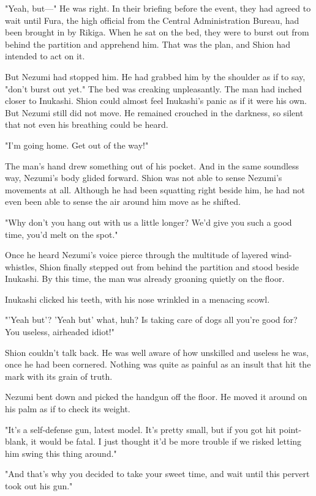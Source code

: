 "Yeah, but---" He was right. In their briefing before the event, they had
agreed to wait until Fura, the high official from the Central
Administration Bureau, had been brought in by Rikiga. When he sat on the
bed, they were to burst out from behind the partition and apprehend him.
That was the plan, and Shion had intended to act on it.

But Nezumi had stopped him. He had grabbed him by the shoulder as if to
say, "don't burst out yet." The bed was creaking unpleasantly. The man
had inched closer to Inukashi. Shion could almost feel Inukashi's panic
as if it were his own. But Nezumi still did not move. He remained
crouched in the darkness, so silent that not even his breathing could be
heard.

"I'm going home. Get out of the way!"

The man's hand drew something out of his pocket. And in the same
soundless way, Nezumi's body glided forward. Shion was not able to sense
Nezumi's movements at all. Although he had been squatting right beside
him, he had not even been able to sense the air around him move as he
shifted.

"Why don't you hang out with us a little longer? We'd give you such a
good time, you'd melt on the spot."

Once he heard Nezumi's voice pierce through the multitude of layered
wind-whistles, Shion finally stepped out from behind the partition and
stood beside Inukashi. By this time, the man was already groaning
quietly on the floor.

Inukashi clicked his teeth, with his nose wrinkled in a menacing scowl.

"'Yeah but'? 'Yeah but' what, huh? Is taking care of dogs all you're
good for? You useless, airheaded idiot!"

Shion couldn't talk back. He was well aware of how unskilled and useless
he was, once he had been cornered. Nothing was quite as painful as an
insult that hit the mark with its grain of truth.

Nezumi bent down and picked the handgun off the floor. He moved it
around on his palm as if to check its weight.

"It's a self-defense gun, latest model. It's pretty small, but if you
got hit point-blank, it would be fatal. I just thought it'd be more
trouble if we risked letting him swing this thing around."

"And that's why you decided to take your sweet time, and wait until this
pervert took out his gun."

